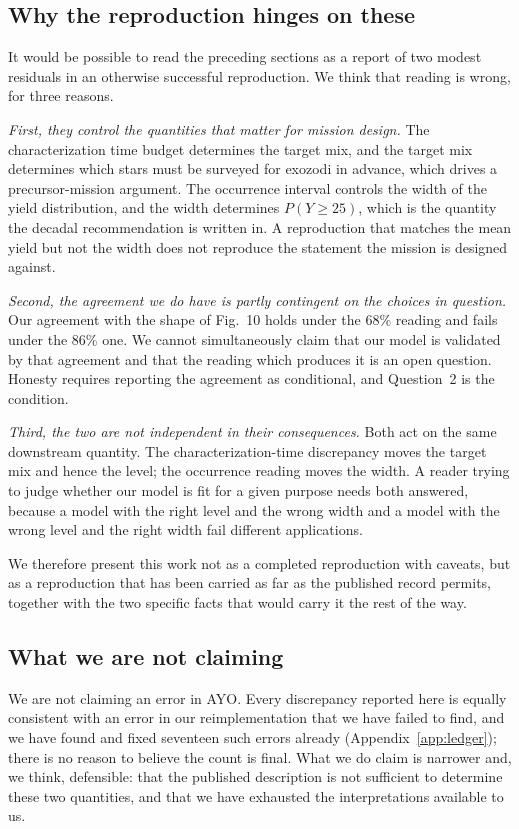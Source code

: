 \documentclass[11pt,a4paper]{article}
\begin{document}
\subsection*{Why the reproduction hinges on these}

It would be possible to read the preceding sections as a report of two modest residuals in an
otherwise successful reproduction. We think that reading is wrong, for three reasons.

\emph{First, they control the quantities that matter for mission design.} The characterization
time budget determines the target mix, and the target mix determines which stars must be
surveyed for exozodi in advance, which drives a precursor-mission argument. The occurrence
interval controls the width of the yield distribution, and the width determines
$P(Y \ge 25)$, which is the quantity the decadal recommendation is written in. A reproduction
that matches the mean yield but not the width does not reproduce the statement the mission is
designed against.

\emph{Second, the agreement we do have is partly contingent on the choices in question.} Our
agreement with the shape of Fig.~10 holds under the 68\% reading and fails under the 86\%
one. We cannot simultaneously claim that our model is validated by that
agreement and that the reading which produces it is an open question. Honesty requires reporting
the agreement as conditional, and Question~2 is the condition.

\emph{Third, the two are not independent in their consequences.} Both act on the same downstream
quantity. The characterization-time discrepancy moves the target mix and hence the level; the
occurrence reading moves the width. A reader trying to judge whether our model is fit for a given
purpose needs both answered, because a model with the right level and the wrong width and a model
with the wrong level and the right width fail different applications.

We therefore present this work not as a completed reproduction with caveats, but as a
reproduction that has been carried as far as the published record permits, together with the two
specific facts that would carry it the rest of the way.

\subsection*{What we are not claiming}

We are not claiming an error in AYO. Every discrepancy reported here is equally consistent with an
error in our reimplementation that we have failed to find, and we have found and fixed seventeen
such errors already (Appendix~\ref{app:ledger}); there is no reason to believe the count is
final. What we do claim is narrower and, we think, defensible: that the published description is
not sufficient to determine these two quantities, and that we have exhausted the interpretations
available to us.
\end{document}
